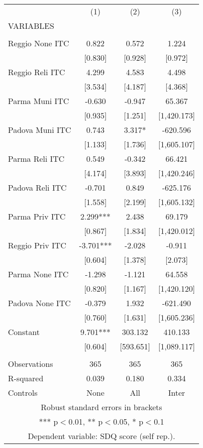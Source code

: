 \begin{tabular}{lccc} \hline
 & (1) & (2) & (3) \\
VARIABLES &  &  &  \\ \hline
 &  &  &  \\
Reggio None ITC & 0.822 & 0.572 & 1.224 \\
 & [0.830] & [0.928] & [0.972] \\
Reggio Reli ITC & 4.299 & 4.583 & 4.498 \\
 & [3.534] & [4.187] & [4.368] \\
Parma Muni ITC & -0.630 & -0.947 & 65.367 \\
 & [0.935] & [1.251] & [1,420.173] \\
Padova Muni ITC & 0.743 & 3.317* & -620.596 \\
 & [1.133] & [1.736] & [1,605.107] \\
Parma Reli ITC & 0.549 & -0.342 & 66.421 \\
 & [4.174] & [3.893] & [1,420.246] \\
Padova Reli ITC & -0.701 & 0.849 & -625.176 \\
 & [1.558] & [2.199] & [1,605.132] \\
Parma Priv ITC & 2.299*** & 2.438 & 69.179 \\
 & [0.867] & [1.834] & [1,420.012] \\
Reggio Priv ITC & -3.701*** & -2.028 & -0.911 \\
 & [0.604] & [1.378] & [2.073] \\
Parma None ITC & -1.298 & -1.121 & 64.558 \\
 & [0.820] & [1.167] & [1,420.120] \\
Padova None ITC & -0.379 & 1.932 & -621.490 \\
 & [0.760] & [1.631] & [1,605.236] \\
Constant & 9.701*** & 303.132 & 410.133 \\
 & [0.604] & [593.651] & [1,089.117] \\
 &  &  &  \\
Observations & 365 & 365 & 365 \\
R-squared & 0.039 & 0.180 & 0.334 \\
 Controls & None & All & Inter \\ \hline
\multicolumn{4}{c}{ Robust standard errors in brackets} \\
\multicolumn{4}{c}{ *** p$<$0.01, ** p$<$0.05, * p$<$0.1} \\
\multicolumn{4}{c}{ Dependent variable: SDQ score (self rep.).} \\
\end{tabular}
